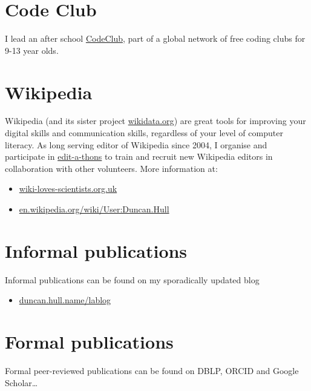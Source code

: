 \documentclass[12pt,]{book}
\providecommand{\tightlist}{%
  \setlength{\itemsep}{0pt}\setlength{\parskip}{0pt}}
\begin{document}
\hypertarget{code-club}{%
\section{Code Club}\label{code-club}}

I lead an after school \href{https://codeclub.org}{CodeClub}, part of a global network of free coding clubs for 9-13 year olds.

\hypertarget{wikipedia}{%
\section{Wikipedia}\label{wikipedia}}

Wikipedia (and its sister project \href{https://www.wikidata.org}{wikidata.org}) are great tools for improving your digital skills and communication skills, regardless of your level of computer literacy. As long serving editor of Wikipedia since 2004, I organise and participate in \href{https://en.wikipedia.org/wiki/Edit-a-thon}{edit-a-thons} to train and recruit new Wikipedia editors in collaboration with other volunteers. More information at:

\begin{itemize}
\tightlist
\item
  \href{https://wiki-loves-scientists.org.uk/}{wiki-loves-scientists.org.uk}
\item
  \href{https://en.wikipedia.org/wiki/User:Duncan.Hull}{en.wikipedia.org/wiki/User:Duncan.Hull}
\end{itemize}

\hypertarget{informal-publications}{%
\section{Informal publications}\label{informal-publications}}

Informal publications can be found on my sporadically updated blog

\begin{itemize}
\tightlist
\item
  \href{https://duncan.hull.name/lablog/}{duncan.hull.name/lablog}
\end{itemize}

\hypertarget{formal-publications}{%
\section{Formal publications}\label{formal-publications}}

Formal peer-reviewed publications can be found on DBLP, ORCID and Google Scholar\ldots{}
\end{document}

